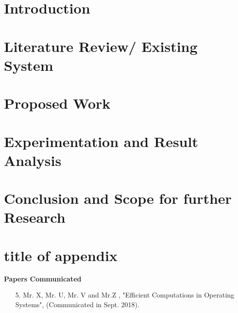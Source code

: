 \documentclass[a4paper, 12pt]{report}
\theoremstyle{definition}
\begin{document}
\clearpage
{}
\setcounter{page}{1}
\chapter{Introduction}

\chapter{Literature Review/ Existing System}

\chapter{Proposed Work}

\chapter{Experimentation and Result Analysis}
 
\chapter{Conclusion and Scope for further Research}

\appendix
\chapter{title of appendix}


\newpage
\renewcommand{\bibname}{References}





\noindent \textbf{\Large Papers Communicated}
\begin{enumerate}
	\item [5.] Mr. X, Mr. U, Mr. V and Mr.Z , "Efficient Computations in Operating Systems", (Communicated in Sept. 2018).
\end{enumerate}
\end{document}
